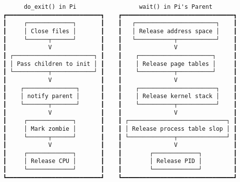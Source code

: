 \documentclass[varwidth=70em,crop]{standalone}
\begin{document}
\begin{verbatim}
      do_exit() in Pi                  wait() in Pi's Parent
┏━━━━━━━━━━━━━━━━━━━━━━━━━━━┓    ┏━━━━━━━━━━━━━━━━━━━━━━━━━━━━━━━━┓
┃     ┌─────────────┐       ┃    ┃   ┌───────────────────────┐    ┃
┃     │ Close files │       ┃    ┃   │ Release address space │    ┃
┃     └──────┬──────┘       ┃    ┃   └───────────┬───────────┘    ┃
┃            V              ┃    ┃               V                ┃
┃ ┌───────────────────────┐ ┃    ┃    ┌─────────────────────┐     ┃
┃ │ Pass children to init │ ┃    ┃    │ Release page tables │     ┃
┃ └──────────┬────────────┘ ┃    ┃    └──────────┬──────────┘     ┃
┃            V              ┃    ┃               V                ┃
┃    ┌───────────────┐      ┃    ┃    ┌──────────────────────┐    ┃
┃    │ notify parent │      ┃    ┃    │ Release kernel stack │    ┃
┃    └───────┬───────┘      ┃    ┃    └──────────┬───────────┘    ┃
┃            V              ┃    ┃               V                ┃
┃     ┌─────────────┐       ┃    ┃ ┌────────────────────────────┐ ┃
┃     │ Mark zombie │       ┃    ┃ │ Release process table slop │ ┃
┃     └──────┬──────┘       ┃    ┃ └─────────────┬──────────────┘ ┃
┃            V              ┃    ┃               V                ┃
┃     ┌─────────────┐       ┃    ┃        ┌─────────────┐         ┃
┃     │ Release CPU │       ┃    ┃        │ Release PID │         ┃
┃     └─────────────┘       ┃    ┃        └─────────────┘         ┃
┗━━━━━━━━━━━━━━━━━━━━━━━━━━━┛    ┗━━━━━━━━━━━━━━━━━━━━━━━━━━━━━━━━┛
\end{verbatim}
\end{document}
